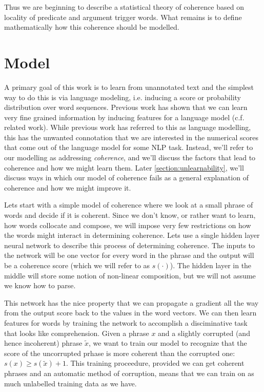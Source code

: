 \documentclass[11pt,letterpaper]{article}
\begin{document}
Thus we are beginning to describe a statistical theory of coherence
based on locality of predicate and argument trigger words.
What remains is to define mathematically how this coherence should be modelled.


\section{Model} %


A primary goal of this work is to learn from unannotated text and
the simplest way to do this is via language modeling, i.e. inducing
a score or probability distribution over word sequences.
Previous work has shown that we can learn very fine grained information
by inducing features for a language model (c.f. related work).
While previous work has referred to this as language modelling,
this has the unwanted connotation that we are interested in the
numerical scores that come out of the language model for some NLP task.
Instead, we'll refer to our modelling as addressing {\em coherence},
and we'll discuss the factors that lead to coherence and how we might learn them. 
Later \ref{section:unlearnability}, we'll discuss ways in which our model of coherence
fails as a general explanation of coherence and how we might improve it.

Lets start with a simple model of coherence where we look at a small phrase of words
and decide if it is coherent. Since we don't know, or rather want to learn, how words
collocate and compose, we will impose very few restrictions on how the words might
interact in determining coherence. Lets use a single hidden layer neural network to
describe this process of determining coherence. The inputs to the network will be one
vector for every word in the phrase and the output will be a coherence score
(which we will refer to as $s(\cdot)$).
The hidden layer in the middle will store some notion of non-linear composition,
but we will not assume we know how to parse.

This network has the nice property that we can propagate a gradient all the
way from the output score back to the values in the word vectors.
We can then learn features for words by training the network to accomplish
a disciminative task that looks like comprehension.
Given a phrase $x$ and a slightly corrupted (and hence incoherent) phrase $\tilde{x}$,
we want to train our model to recognize that the score of the uncorrupted prhase
is more coherent than the corrupted one: $s(x) \ge s(\tilde{x}) + 1$.
This training proceedure, provided we can get coherent phrases and an automatic method of
corruption, means that we can train on as much unlabelled training data as we have.
\end{document}
